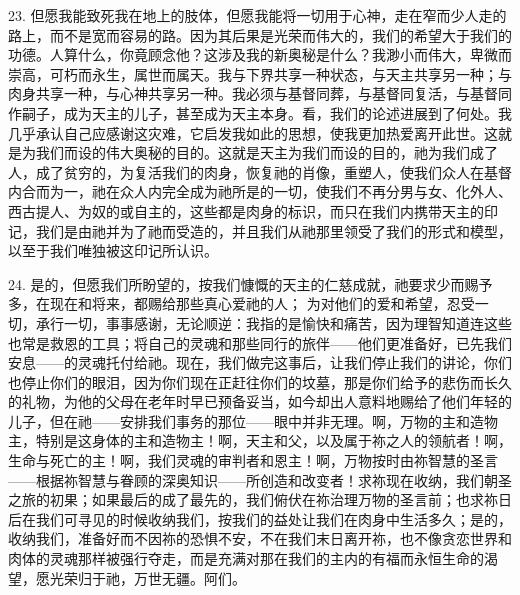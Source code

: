 23. 但愿我能致死我在地上的肢体，但愿我能将一切用于心神，走在窄而少人走的路上，而不是宽而容易的路。因为其后果是光荣而伟大的，我们的希望大于我们的功德。人算什么，你竟顾念他？这涉及我的新奥秘是什么？我渺小而伟大，卑微而崇高，可朽而永生，属世而属天。我与下界共享一种状态，与天主共享另一种；与肉身共享一种，与心神共享另一种。我必须与基督同葬，与基督同复活，与基督同作嗣子，成为天主的儿子，甚至成为天主本身。看，我们的论述进展到了何处。我几乎承认自己应感谢这灾难，它启发我如此的思想，使我更加热爱离开此世。这就是为我们而设的伟大奥秘的目的。这就是天主为我们而设的目的，祂为我们成了人，成了贫穷的，为复活我们的肉身，恢复祂的肖像，重塑人，使我们众人在基督内合而为一，祂在众人内完全成为祂所是的一切，使我们不再分男与女、化外人、西古提人、为奴的或自主的，这些都是肉身的标识，而只在我们内携带天主的印记，我们是由祂并为了祂而受造的，并且我们从祂那里领受了我们的形式和模型，以至于我们唯独被这印记所认识。\par

24. 是的，但愿我们所盼望的，按我们慷慨的天主的仁慈成就，祂要求少而赐予多，在现在和将来，都赐给那些真心爱祂的人； 为对他们的爱和希望，忍受一切，承行一切，事事感谢，无论顺逆：我指的是愉快和痛苦，因为理智知道连这些也常是救恩的工具；将自己的灵魂和那些同行的旅伴——他们更准备好，已先我们安息——的灵魂托付给祂。现在，我们做完这事后，让我们停止我们的讲论，你们也停止你们的眼泪，因为你们现在正赶往你们的坟墓，那是你们给予的悲伤而长久的礼物，为他的父母在老年时早已预备妥当，如今却出人意料地赐给了他们年轻的儿子，但在祂——安排我们事务的那位——眼中并非无理。啊，万物的主和造物主，特别是这身体的主和造物主！啊，天主和父，以及属于祢之人的领航者！啊，生命与死亡的主！啊，我们灵魂的审判者和恩主！啊，万物按时由祢智慧的圣言——根据祢智慧与眷顾的深奥知识——所创造和改变者！求祢现在收纳，我们朝圣之旅的初果；如果最后的成了最先的，我们俯伏在祢治理万物的圣言前；也求祢日后在我们可寻见的时候收纳我们，按我们的益处让我们在肉身中生活多久；是的，收纳我们，准备好而不因祢的恐惧不安，不在我们末日离开祢，也不像贪恋世界和肉体的灵魂那样被强行夺走，而是充满对那在我们的主内的有福而永恒生命的渴望，愿光荣归于祂，万世无疆。阿们。\par


